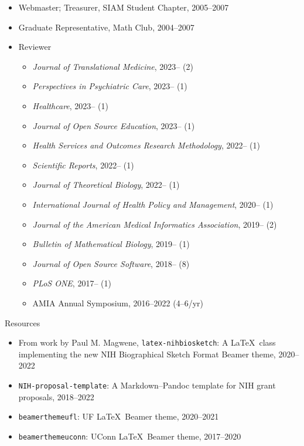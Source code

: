 \documentclass[10pt,a4paper]{article}
\begin{document}
\begin{itemize}[label=$\circ$,nolistsep]
\item
Webmaster; Treasurer, SIAM Student Chapter, 2005--2007
\item
Graduate Representative, Math Club, 2004--2007
\item
Reviewer
\begin{itemize}[label=$\circ$,nolistsep]
\item
{\itshape Journal of Translational Medicine}, 2023-- (2)
\item
{\itshape Perspectives in Psychiatric Care}, 2023-- (1)
\item
{\itshape Healthcare}, 2023-- (1)
\item
{\itshape Journal of Open Source Education}, 2023-- (1)
\item
{\itshape Health Services and Outcomes Research Methodology}, 2022-- (1)
\item
{\itshape Scientific Reports}, 2022-- (1)
\item
{\itshape Journal of Theoretical Biology}, 2022-- (1)
\item
{\itshape International Journal of Health Policy and Management}, 2020-- (1)
\item
{\itshape Journal of the American Medical Informatics Association}, 2019-- (2)
\item
{\itshape Bulletin of Mathematical Biology}, 2019-- (1)
\item
{\itshape Journal of Open Source Software}, 2018-- (8)
\item
{\itshape PLoS ONE}, 2017-- (1)
\item
AMIA Annual Symposium, 2016--2022 (4--6/yr)
\end{itemize}
\end{itemize}

\vspace{.25cm}
{\sc Resources}
\begin{itemize}[label=$\circ$,nolistsep]
\item
From work by Paul M. Magwene, {\tt\small latex-nihbiosketch}: A \LaTeX\ class implementing the new NIH Biographical Sketch Format {\sffamily Beamer} theme, 2020--2022
\item
{\tt\small NIH-proposal-template}: A Markdown--Pandoc template for NIH grant proposals, 2018--2022
\item
{\tt\small beamerthemeufl}: UF \LaTeX\ {\sffamily Beamer} theme, 2020--2021
\item
{\tt\small beamerthemeuconn}: UConn \LaTeX\ {\sffamily Beamer} theme, 2017--2020
\end{itemize}
\end{document}
